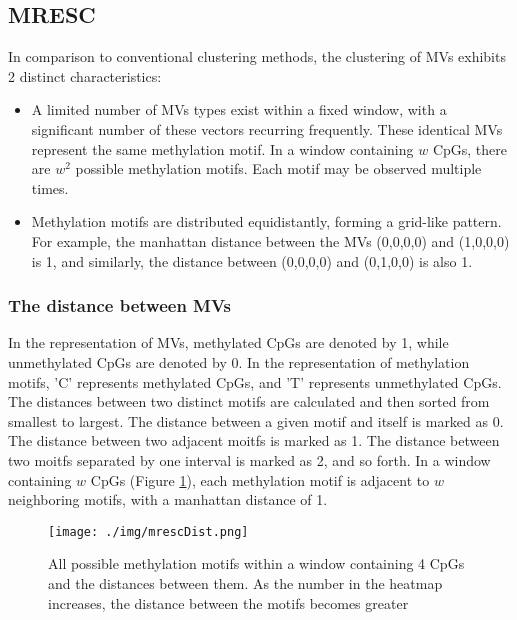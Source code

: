 \documentclass[12pt,letterpaper]{article}
\begin{document}
\subsection{MRESC}

In comparison to conventional clustering methods, the clustering of MVs exhibits 2 distinct 
characteristics:

\begin{itemize}
    \item  A limited number of MVs types exist within a fixed window, with a significant number 
    of these vectors recurring frequently. These identical MVs represent the same methylation 
    motif. In a window containing $w$ CpGs, there are $w^2$ possible methylation motifs. Each 
    motif may be observed multiple times. 
    \item  Methylation motifs are distributed equidistantly, forming a grid-like pattern. For 
    example, the manhattan distance between the MVs (0,0,0,0) and (1,0,0,0) is 1, and similarly,
    the distance between (0,0,0,0) and (0,1,0,0) is also 1.
\end{itemize}

\subsubsection{The distance between MVs}

In the representation of MVs, methylated CpGs are denoted by 1, while unmethylated CpGs are denoted 
by 0. In the representation of methylation motifs, 'C' represents methylated CpGs, and 'T' 
represents unmethylated CpGs. The distances between two distinct motifs are calculated and then 
sorted from smallest to largest. The distance between a given motif and itself is marked as 0. The 
distance between two adjacent moitfs is marked as 1. The distance between two moitfs separated by 
one interval is marked as 2, and so forth. In a window containing $w$ CpGs (Figure \ref*{fig:MRESC}), 
each methylation motif is adjacent to $w$ neighboring motifs, with a manhattan distance of 1.

\begin{figure}[ht]
    \centering
    \texttt{[image: ./img/mrescDist.png]}
    \caption{
        All possible methylation motifs within a window containing 4 CpGs and the 
        distances between them. As the number in the heatmap increases, the distance 
        between the motifs becomes greater
    }
    \label{fig:MRESC}
\end{figure}
\end{document}
